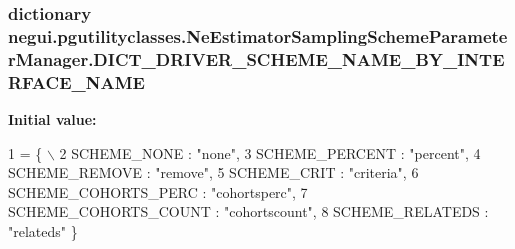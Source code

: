 \subsubsection[{\texorpdfstring{D\+I\+C\+T\+\_\+\+D\+R\+I\+V\+E\+R\+\_\+\+S\+C\+H\+E\+M\+E\+\_\+\+N\+A\+M\+E\+\_\+\+B\+Y\+\_\+\+I\+N\+T\+E\+R\+F\+A\+C\+E\+\_\+\+N\+A\+ME}{DICT_DRIVER_SCHEME_NAME_BY_INTERFACE_NAME}}]{\setlength{\rightskip}{0pt plus 5cm}dictionary negui.\+pgutilityclasses.\+Ne\+Estimator\+Sampling\+Scheme\+Parameter\+Manager.\+D\+I\+C\+T\+\_\+\+D\+R\+I\+V\+E\+R\+\_\+\+S\+C\+H\+E\+M\+E\+\_\+\+N\+A\+M\+E\+\_\+\+B\+Y\+\_\+\+I\+N\+T\+E\+R\+F\+A\+C\+E\+\_\+\+N\+A\+ME\hspace{0.3cm}{\ttfamily [static]}}\hypertarget{classnegui_1_1pgutilityclasses_1_1NeEstimatorSamplingSchemeParameterManager_a889b77f9fd9bc79216f6aa086a79dae5}{}\label{classnegui_1_1pgutilityclasses_1_1NeEstimatorSamplingSchemeParameterManager_a889b77f9fd9bc79216f6aa086a79dae5}
{\bfseries Initial value\+:}
\begin{DoxyCode}
1 = \{ \(\backslash\)
2                 SCHEME\_NONE : \textcolor{stringliteral}{"none"},
3                 SCHEME\_PERCENT : \textcolor{stringliteral}{"percent"},
4                 SCHEME\_REMOVE : \textcolor{stringliteral}{"remove"},
5                 SCHEME\_CRIT : \textcolor{stringliteral}{"criteria"},
6                 SCHEME\_COHORTS\_PERC : \textcolor{stringliteral}{"cohortsperc"},
7                 SCHEME\_COHORTS\_COUNT : \textcolor{stringliteral}{"cohortscount"},
8                 SCHEME\_RELATEDS : \textcolor{stringliteral}{"relateds"} \}
\end{DoxyCode}


